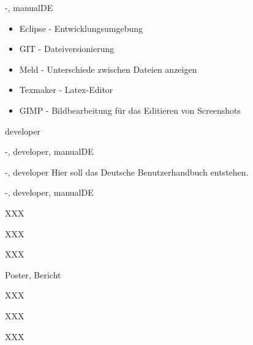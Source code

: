 \documentclass[twoside]{report}
\begin{document}
\begin{shownto}{-, manualDE}
\nsecend

\begin{itemize}
\item{Eclipse - Entwicklungsumgebung}
\item{GIT - Dateiversionierung}
\item{Meld - Unterschiede zwischen Dateien anzeigen}
\item{Texmaker - Latex-Editor}
\item{GIMP - Bildbearbeitung für das Editieren von Screenshots}
\end{itemize}
\nsecend



\nsecend %

\end{shownto} %
\begin{shownto}{developer}


\end{shownto}

\begin{shownto}{-, developer, manualDE}



\nsecend

\nsecend




\end{shownto} %
\begin{shownto}{-, developer}
Hier soll das Deutsche Benutzerhandbuch entstehen.
\end{shownto} %
\begin{shownto}{-, developer, manualDE}
\nsecend

XXX
\nsecend

XXX
\nsecend

\nsecend %



XXX
\nsecend

Poster, Bericht
\nsecend

XXX
\nsecend

XXX
\nsecend

XXX
\nsecend


\nsecend %

\end{shownto} %
\end{document}
